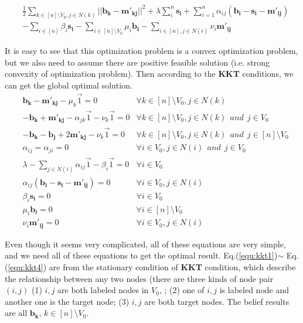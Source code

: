 \begin{align*}
&\frac{1}{2}\mathop{\sum}_{k \in [n]\setminus V_0, j\in N(k)}||\mathbf{b_k} - \mathbf{m'_{kj}}||^2 + \lambda\sum_i^n\mathbf{s_i} + \mathop{\sum}_{i=1}^n\alpha_{ij}(\mathbf{b_i}
-\mathbf{s_i} -  \mathbf{m'_{ij}}) \\&- \sum_{i\in [n]} \beta_{i}\mathbf{s_i} - \sum_{i\in [n]\setminus V_0} \mu_{i}\mathbf{b_i} - \sum_{i\in [n], j\in N(i)} \nu_{i}\mathbf{m'_{ij}}
\end{align*}



It is easy to see that this optimization problem is a convex optimization problem, but we also need to assume there are positive feasible solution (i.e. strong convexity of optimization problem). Then according to the \textbf{KKT} conditions, we can get the global optimal solution.
\begin{align}
\label{equ:kkt1}
&\mathbf{b_k} - \mathbf{m'_{kj}} - \mu_k\vec{1} = 0 ~~~~&\forall k\in [n]\setminus V_0, j\in N(k)\\
\label{equ:kkt2}
&- \mathbf{b_k} + \mathbf{m'_{kj}} - \alpha_{jk}\vec{1} - \nu_{k}\vec{1} = 0 &\forall k\in [n]\setminus V_0, j\in N(k)~~and~~j\in V_0\\
\label{equ:kkt3}
&- \mathbf{b_k} - \mathbf{b_j} + 2\mathbf{m'_{kj}} - \nu_{k}\vec{1} = 0 &\forall k\in [n]\setminus V_0, j\in N(k)~~and~~j\in [n]\setminus V_0\\
\label{equ:kkt4}
& \alpha_{ij} = \alpha_{ji} = 0 &\forall i\in V_0, j\in N(i)~~and~~j\in V_0\\
\label{equ:kkt5}
&\lambda - \sum_{j\in N(i)}\alpha_{ij}\vec{1} - \beta_i \vec{1}=0 &\forall i\in V_0\\
\label{equ:kkt6}
&\alpha_{ij}(\mathbf{b_i}-\mathbf{s_i}- \mathbf{m'_{ij}}) = 0 &\forall i\in V_0, j\in N(i)\\
\label{equ:kkt7}
&\beta_i \mathbf{s_i} = 0 &\forall i\in V_0\\
\label{equ:kkt8}
&\mu_i \mathbf{b_i} = 0 &\forall i\in [n]\setminus V_0\\
\label{equ:kkt9}
&\nu_i \mathbf{m'_{ij}} = 0 &\forall i\in V_0, j\in N(i)
\end{align}

Even though it seems very complicated, all of these equations are very simple, and we need all of these equations to get the optimal result.  Eq.(\ref{equ:kkt1})$\sim$ Eq.(\ref{equ:kkt4}) are from the stationary condition of \textbf{KKT} condition, which describe the relationship between any two nodes (there are three kinds of node pair $(i,j)$ (1) $i,j$ are both labeled nodes in $V_0$, ; (2) one of $i,j$ is labeled node and another one is the target node; (3) $i,j$ are both target nodes. The belief results are all $\mathbf{b_k}$, $k\in [n]\setminus V_0$.

